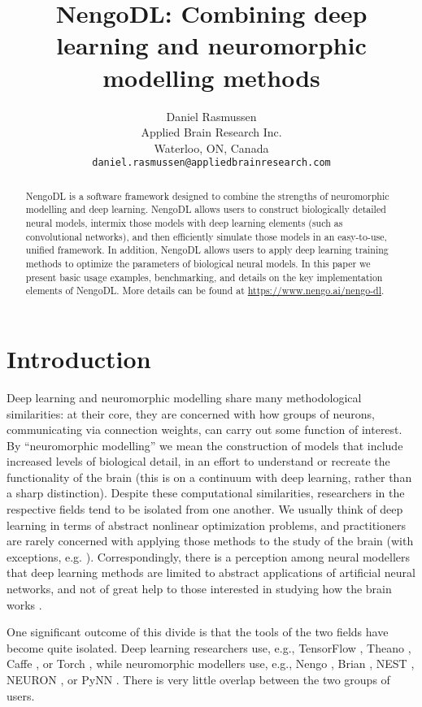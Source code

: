 \documentclass{article}
\title{NengoDL: Combining deep learning and neuromorphic modelling methods}
\author{
Daniel Rasmussen \\
Applied Brain Research Inc.\\
Waterloo, ON, Canada \\
\texttt{daniel.rasmussen@appliedbrainresearch.com}
}
\begin{document}
\maketitle

\begin{abstract}
NengoDL is a software framework designed to combine the strengths of neuromorphic modelling and deep learning.  NengoDL allows users to construct biologically detailed neural models, intermix those models with deep learning elements (such as convolutional networks), and then efficiently simulate those models in an easy-to-use, unified framework.  In addition, NengoDL allows users to apply deep learning training methods to optimize the parameters of biological neural models.  In this paper we present basic usage examples, benchmarking, and details on the key implementation elements of NengoDL.  More details can be found at \url{https://www.nengo.ai/nengo-dl}.
\end{abstract}

\section{Introduction}

Deep learning and neuromorphic modelling share many methodological similarities: at their core, they are concerned with how groups of neurons, communicating via connection weights, can carry out some function of interest.  By ``neuromorphic modelling'' we mean the construction of models that include increased levels of biological detail, in an effort to understand or recreate the functionality of the brain (this is on a continuum with deep learning, rather than a sharp distinction).  Despite these computational similarities, researchers in the respective fields tend to be isolated from one another.  We usually think of deep learning in terms of abstract nonlinear optimization problems, and practitioners are rarely concerned with applying those methods to the study of the brain (with exceptions, e.g. \citealt{Kriegeskorte2015,Yamins2016}).  Correspondingly, there is a perception among neural modellers that deep learning methods are limited to abstract applications of artificial neural networks, and not of great help to those interested in studying how the brain works \citep{Kay2017}.

One significant outcome of this divide is that the tools of the two fields have become quite isolated.  Deep learning researchers use, e.g., TensorFlow \citep{Abadi2016}, Theano \citep{Team2016}, Caffe \citep{Jia2014}, or Torch \citep{Collobert2011}, while neuromorphic modellers use, e.g., Nengo \citep{Bekolay2014}, Brian \citep{Stimberg2013}, NEST \citep{Gewaltig2007}, NEURON \citep{Hines1997}, or PyNN \citep{Davison2009}. There is very little overlap between the two groups of users.
\end{document}
